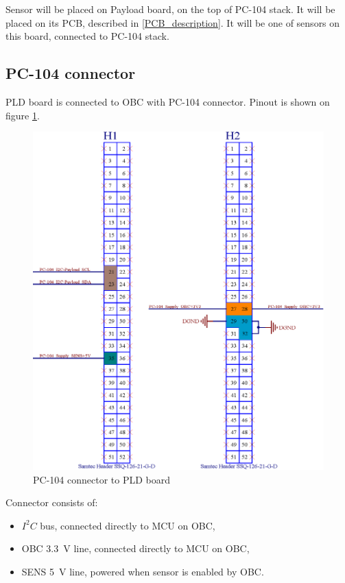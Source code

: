 	Sensor will be placed on Payload board, on the top of PC-104 stack. It will be placed on its PCB, described in \ref{PCB_description}. It will be one of sensors on this board, connected to PC-104 stack.
	
	
\subsection{PC-104 connector}
	PLD board is connected to OBC with PC-104 connector. Pinout is shown on figure \ref{PC104_PLD}.
	
	\begin{figure}[H]
		\centering
		\includegraphics[width=0.5\paperwidth]{img/PC-104.eps}
		\caption{PC-104 connector to PLD board}
		\label{PC104_PLD}
	\end{figure}

	Connector consists of:
	\begin{itemize}
		\item $I^2C$ bus, connected directly to MCU on OBC,
		\item OBC \SI{3.3}{\volt} line, connected directly to MCU on OBC,
		\item SENS \SI{5}{\volt} line, powered when sensor is enabled by OBC.
	\end{itemize}


